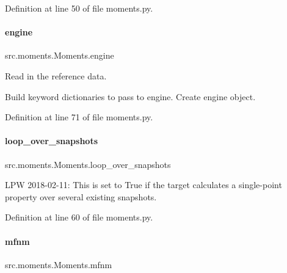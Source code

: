 Definition at line 50 of file moments.\+py.

\mbox{\label{classsrc_1_1moments_1_1Moments_ae3486cce343d676ffabf9c0f0f2bd7ca}} 
\paragraph{\texorpdfstring{engine}{engine}}
{\footnotesize\ttfamily src.\+moments.\+Moments.\+engine}



Read in the reference data. 

Build keyword dictionaries to pass to engine. Create engine object. 

Definition at line 71 of file moments.\+py.

\mbox{\label{classsrc_1_1moments_1_1Moments_a39ad9d5899f0865d6776c0319021add6}} 
\paragraph{\texorpdfstring{loop\+\_\+over\+\_\+snapshots}{loop\_over\_snapshots}}
{\footnotesize\ttfamily src.\+moments.\+Moments.\+loop\+\_\+over\+\_\+snapshots}



L\+PW 2018-\/02-\/11\+: This is set to True if the target calculates a single-\/point property over several existing snapshots. 



Definition at line 60 of file moments.\+py.

\mbox{\label{classsrc_1_1moments_1_1Moments_abfe7bfc989f78323b9fecd71292b8b57}} 
\paragraph{\texorpdfstring{mfnm}{mfnm}}
{\footnotesize\ttfamily src.\+moments.\+Moments.\+mfnm}



